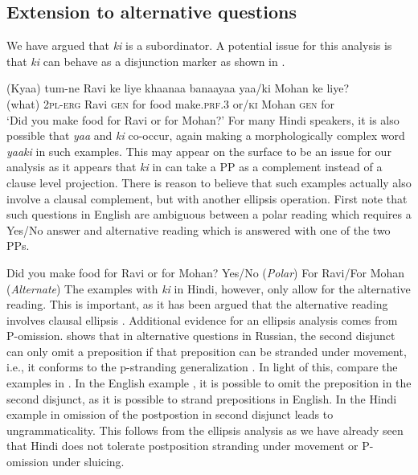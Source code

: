 \documentclass[output=paper]{langscibook}
\begin{document}
\subsection{Extension to alternative questions}
We have argued that \emph{ki} is a subordinator. A potential issue for this analysis is that \emph{ki} can behave as a disjunction marker as shown in .

\ea \label{maex34}
    \gll (Kyaa) tum-ne Ravi ke liye khaanaa banaayaa yaa/ki Mohan ke liye?\\
    (what) \textsc{2pl-erg} Ravi \textsc{gen} for food make.\textsc{prf.3} or/\textsc{ki} Mohan \textsc{gen} for\\
    \glt `Did you make food for Ravi or for Mohan?'
\z 
For many Hindi speakers, it is also possible that \emph{yaa} and \emph{ki} co-occur, again making a morphologically complex word \emph{yaaki} in such examples. This may appear on the surface to be an issue for our analysis as it appears that \emph{ki} in  can take a PP as a complement instead of a clause level projection. There is reason to believe that such examples actually also involve a clausal complement, but with another ellipsis operation. First note that such questions in English are ambiguous between a polar reading which requires a Yes/No answer and alternative reading which is answered with one of the two PPs.

\ea 
    Did you make food for Ravi or for Mohan?
    \ea 
        Yes/No (\emph{Polar})
    \ex 
        For Ravi/For Mohan (\emph{Alternate})
    \z 
\z 
The examples with \emph{ki} in Hindi, however, only allow for the alternative reading. This is important, as it has been argued that the alternative reading involves clausal ellipsis \citep{han04,gracanin16,podobryaev17}. Additional evidence for an ellipsis analysis comes from P-omission. \cite{podobryaev17} shows that in alternative questions in Russian, the second disjunct can only omit a preposition if that preposition can be stranded under movement, i.e., it conforms to the p-stranding generalization \citep{merchant01}. In light of this, compare the examples in . In the English example , it is possible to omit the preposition in the second disjunct, as it is possible to strand prepositions in English. In the Hindi example in  omission of the postpostion in second disjunct leads to ungrammaticality. This follows from the ellipsis analysis as we have already seen that Hindi does not tolerate postposition stranding under movement or P-omission under sluicing.
\end{document}
